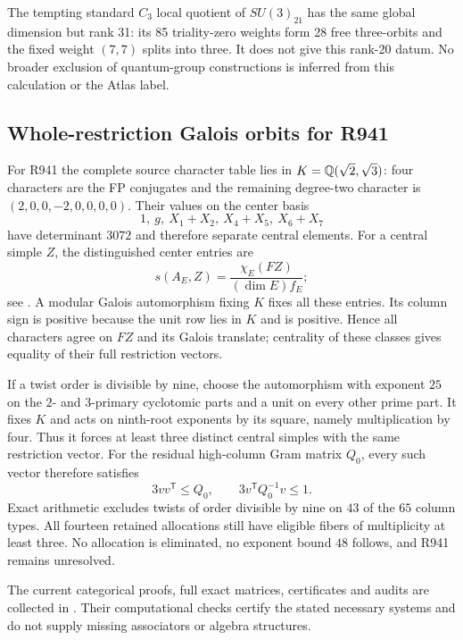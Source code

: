 The tempting standard $C_3$ local quotient of $SU(3)_{21}$ has the same
global dimension but rank 31: its 85 triality-zero weights form 28 free
three-orbits and the fixed weight $(7,7)$ splits into three. It does
not give this rank-20 datum. No broader exclusion of quantum-group
constructions is inferred from this calculation or the Atlas label.
\subsection{Whole-restriction Galois orbits for R941}
For R941 the complete source character table lies in
$K=\mathbb Q(\sqrt2,\sqrt3)$: four characters are the FP conjugates and the
remaining degree-two character is $(2,0,0,-2,0,0,0,0)$. Their values on
the center basis
\[
 1,\ g,\ X_1+X_2,\ X_4+X_5,\ X_6+X_7
\]
have determinant $3072$ and therefore separate central elements.
For a central simple $Z$, the distinguished center entries are
\[
 s(A_E,Z)=\frac{\chi_E(FZ)}{(\dim E)f_E};
\]
see \cite{DeshpandeCenter}. A modular Galois automorphism fixing $K$
fixes all these entries. Its column sign is positive because the unit
row lies in $K$ and is positive. Hence all characters agree on
$FZ$ and its Galois translate; centrality of these classes gives equality
of their full restriction vectors.

If a twist order is divisible by nine, choose the automorphism with
exponent $25$ on the $2$- and $3$-primary cyclotomic parts and a unit on
every other prime part. It fixes $K$ and acts on ninth-root exponents by
its square, namely multiplication by four. Thus it forces at least
three distinct central simples with the same restriction vector.
For the residual high-column Gram matrix $Q_0$, every such vector
therefore satisfies
\[
 3vv^{\mathsf T}\le Q_0,\qquad
 3v^{\mathsf T}Q_0^{-1}v\le1.
\]
Exact arithmetic excludes twists of order divisible by nine on $43$ of
the $65$ column types. All fourteen retained allocations still have
eligible fibers of multiplicity at least three. No allocation is
eliminated, no exponent bound $48$ follows, and R941 remains unresolved.

The current categorical proofs, full exact matrices, certificates and
audits are collected in . Their
computational checks certify the stated necessary systems and do not
supply missing associators or algebra structures.

